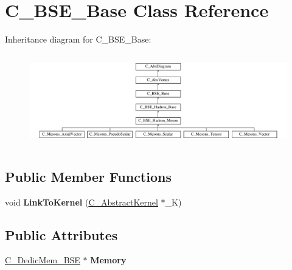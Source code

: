 \hypertarget{class_c___b_s_e___base}{\section{C\-\_\-\-B\-S\-E\-\_\-\-Base Class Reference}
\label{class_c___b_s_e___base}
}
Inheritance diagram for C\-\_\-\-B\-S\-E\-\_\-\-Base\-:\begin{figure}[H]
\begin{center}
\leavevmode
\includegraphics[height=4.048193cm]{class_c___b_s_e___base}
\end{center}
\end{figure}
\subsection*{Public Member Functions}
\begin{DoxyCompactItemize}
\item 
\hypertarget{class_c___b_s_e___base_a4a6278f1af16d8dc05cb59d5c9bea095}{void {\bfseries Link\-To\-Kernel} (\hyperlink{class_c___abstract_kernel}{C\-\_\-\-Abstract\-Kernel} $\ast$\-\_\-\-K)}\label{class_c___b_s_e___base_a4a6278f1af16d8dc05cb59d5c9bea095}

\end{DoxyCompactItemize}
\subsection*{Public Attributes}
\begin{DoxyCompactItemize}
\item 
\hypertarget{class_c___b_s_e___base_ac0079454bdbd7d5064b4cec334abd0ec}{\hyperlink{class_c___dedic_mem___b_s_e}{C\-\_\-\-Dedic\-Mem\-\_\-\-B\-S\-E} $\ast$ {\bfseries Memory}}\label{class_c___b_s_e___base_ac0079454bdbd7d5064b4cec334abd0ec}

\end{DoxyCompactItemize}

